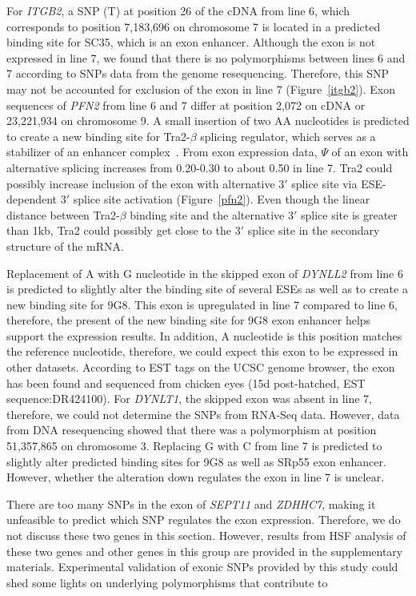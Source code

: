 \documentclass[10pt]{article}
\begin{document}
For {\em ITGB2}, a SNP (T) at position 26 of the cDNA from line 6, which
corresponds to position 7,183,696 on chromosome 7 is located in a predicted
binding site for SC35, which is an exon enhancer.  Although the exon is not
expressed in line 7, we found that there is no polymorphisms between lines 6 and
7 according to SNPs data from the genome resequencing.  Therefore, this SNP may
not be accounted for exclusion of the exon in line 7 (Figure~\ref{itgb2}).  Exon
sequences of {\em PFN2} from line 6 and 7 differ at position 2,072 on cDNA or
23,221,934 on chromosome 9.  A small insertion of two AA nucleotides is
predicted to create a new binding site for Tra2-$\beta$ splicing regulator,
which serves as a stabilizer of an enhancer complex~\cite{lopez1998alternative}.
From exon expression data, $\Psi$ of an exon with alternative splicing increases
from 0.20-0.30 to about 0.50 in line 7.  Tra2 could possibly increase inclusion
of the exon with alternative 3$\prime$ splice site via ESE-dependent 3$\prime$
splice site activation (Figure~\ref{pfn2}).  Even though the linear distance
between Tra2-$\beta$ binding site and the alternative 3$\prime$ splice site is
greater than 1kb, Tra2 could possibly get close to the 3$\prime$ splice site in
the secondary structure of the mRNA.

Replacement of A with G nucleotide in the skipped exon of {\em DYNLL2} from line
6 is predicted to slightly alter the binding site of several ESEs as well as to
create a new binding site for 9G8.  This exon is upregulated in line 7 compared
to line 6, therefore, the present of the new binding site for 9G8 exon enhancer
helps support the expression results.  In addition, A nucleotide is this
position matches the reference nucleotide, therefore, we could expect this exon
to be expressed in other datasets.  According to EST tags on the UCSC genome
browser, the exon has been found and sequenced from chicken eyes (15d
post-hatched, EST sequence:DR424100).  For {\em DYNLT1}, the skipped exon was
absent in line 7, therefore, we could not determine the SNPs from RNA-Seq data.
However, data from DNA resequencing showed that there was a polymorphism at
position 51,357,865 on chromosome 3.  Replacing G with C from line 7 is
predicted to slightly alter predicted binding sites for 9G8 as well as SRp55
exon enhancer.  However, whether the alteration down regulates the exon in line
7 is unclear.

There are too many SNPs in the exon of {\em SEPT11} and {\em ZDHHC7}, making it
unfeasible to predict which SNP regulates the exon expression.  Therefore, we do
not discuss these two genes in this section.  However, results from HSF analysis
of these two genes and other genes in this group are provided in the
supplementary materials.  Experimental validation of exonic SNPs provided by
this study could shed some lights on underlying polymorphisms that contribute to
\end{document}
